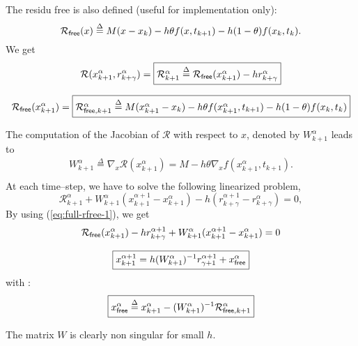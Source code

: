 The residu free is also defined (useful for implementation only):
\[\mathcal R _{{\sf free}}(x) \stackrel{\Delta}{=}  M(x - x_{k}) -h\theta f( x , t_{k+1}) - h(1-\theta)f(x_k,t_k).\]
We get
\begin{equation}
  \mathcal R (x^{\alpha}_{k+1},r^{\alpha}_{k+\gamma}) = \fbox{$\mathcal R^{\alpha}_{k+1} \stackrel{\Delta}{=}  \mathcal R_{{\sf free}}(x^{\alpha}_{k+1} )  - h r^{\alpha}_{k+\gamma}$}\label{eq:full-rfree-1}
\end{equation}

\[  \mathcal R
_{{\sf free}}(x^{\alpha}_{k+1} )=\fbox{$ \mathcal R _{{\sf free}, k+1} ^{\alpha} \stackrel{\Delta}{=}  M(x^{\alpha}_{k+1} - x_{k}) -h\theta f( x^{\alpha}_{k+1} , t_{k+1}) - h(1-\theta)f(x_k,t_k)$}\]
 
The computation of the Jacobian of $\mathcal R$ with respect to $x$, denoted by $   W^{\alpha}_{k+1}$ leads to 
\begin{equation}
   \label{eq:full-NL9}
   \begin{array}{l}
    W^{\alpha}_{k+1} \stackrel{\Delta}{=} \nabla_{x} \mathcal R (x^{\alpha}_{k+1})= M - h  \theta \nabla_{x} f(  x^{\alpha}_{k+1}, t_{k+1} ).\\
 \end{array}
\end{equation}
At each time--step, we have to solve the following linearized problem,
\begin{equation}
   \label{eq:full-NL10}
    \mathcal R^{\alpha}_{k+1} + W^{\alpha}_{k+1} (x^{\alpha+1}_{k+1} -
    x^{\alpha}_{k+1}) - h  (r^{\alpha+1}_{k+\gamma} - r^{\alpha}_{k+\gamma} )  =0 ,
\end{equation}
By using (\ref{eq:full-rfree-1}), we get
\begin{equation}
  \label{eq:full-rfree-2}
  \mathcal R _{{\sf free}}(x^{\alpha}_{k+1})  - h  r^{\alpha+1}_{k+\gamma}   + W^{\alpha}_{k+1} (x^{\alpha+1}_{k+1} -
    x^{\alpha}_{k+1})  =0 
\end{equation}

{
  \begin{equation}
    \boxed{ x^{\alpha+1}_{k+1} = h(W^{\alpha}_{k+1})^{-1}r^{\alpha+1}_{\gamma+1} +x^\alpha_{{\sf free}}}
  \end{equation}
}
with :
\begin{equation}
  \boxed{x^\alpha_{{\sf free}}\stackrel{\Delta}{=}x^{\alpha}_{k+1}-(W^{\alpha}_{k+1})^{-1}\mathcal R_{{\sf free},k+1}^{\alpha} \label{eq:full-rfree-12}}
\end{equation}

The matrix $W$ is clearly non singular for small $h$.

